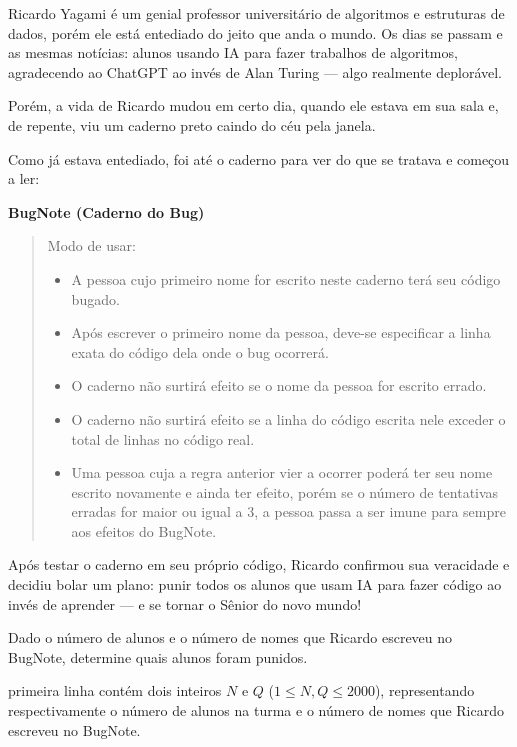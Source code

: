 
Ricardo Yagami é um genial professor universitário de algoritmos e estruturas de dados, porém ele está entediado do jeito que anda o mundo.  
Os dias se passam e as mesmas notícias: alunos usando IA para fazer trabalhos de algoritmos, agradecendo ao ChatGPT ao invés de Alan Turing — algo realmente deplorável.

Porém, a vida de Ricardo mudou em certo dia, quando ele estava em sua sala e, de repente, viu um caderno preto caindo do céu pela janela.  

Como já estava entediado, foi até o caderno para ver do que se tratava e começou a ler:

\begin{center}
\textbf{BugNote (Caderno do Bug)}\\
\end{center}

\begin{quote}
Modo de usar:
\begin{itemize}
  \item A pessoa cujo primeiro nome for escrito neste caderno terá seu código bugado.
  \item Após escrever o primeiro nome da pessoa, deve-se especificar a linha exata do código dela onde o bug ocorrerá.
  \item O caderno não surtirá efeito se o nome da pessoa for escrito errado.
  \item O caderno não surtirá efeito se a linha do código escrita nele exceder o total de linhas no código real.
  \item Uma pessoa cuja a regra anterior vier a ocorrer poderá ter seu nome escrito novamente e ainda ter efeito, porém se o número de tentativas erradas for maior ou igual a $3$, a pessoa passa a ser imune para sempre aos efeitos do BugNote.
\end{itemize}
\end{quote}

Após testar o caderno em seu próprio código, Ricardo confirmou sua veracidade e decidiu bolar um plano: punir todos os alunos que usam IA para fazer código ao invés de aprender — e se tornar o Sênior do novo mundo!

Dado o número de alunos e o número de nomes que Ricardo escreveu no BugNote, determine quais alunos foram punidos.

 primeira linha contém dois inteiros $N$ e $Q$ ($1 \leq N, Q \leq 2000$), representando respectivamente o número de alunos na turma e o número de nomes que Ricardo escreveu no BugNote.

